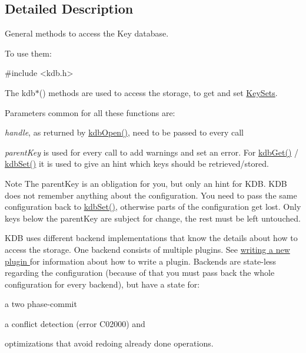 \subsection{Detailed Description}
General methods to access the Key database. 

To use them\+: 
\begin{DoxyCode}
\textcolor{preprocessor}{#include <kdb.h>}
\end{DoxyCode}


The kdb$\ast$() methods are used to access the storage, to get and set \hyperlink{group__keyset}{Key\+Sets}.

Parameters common for all these functions are\+:


\begin{DoxyItemize}
\item {\itshape handle}, as returned by \hyperlink{group__kdb_ga844e1299a84c3fbf1d3a905c5c893ba5}{kdb\+Open()}, need to be passed to every call
\item {\itshape parent\+Key} is used for every call to add warnings and set an error. For \hyperlink{group__kdb_ga28e385fd9cb7ccfe0b2f1ed2f62453a1}{kdb\+Get()} / \hyperlink{group__kdb_ga11436b058408f83d303ca5e996832bcf}{kdb\+Set()} it is used to give an hint which keys should be retrieved/stored.
\end{DoxyItemize}

\begin{DoxyNote}{Note}
The parent\+Key is an obligation for you, but only an hint for K\+DB. K\+DB does not remember anything about the configuration. You need to pass the same configuration back to \hyperlink{group__kdb_ga11436b058408f83d303ca5e996832bcf}{kdb\+Set()}, otherwise parts of the configuration get lost. Only keys below the parent\+Key are subject for change, the rest must be left untouched.
\end{DoxyNote}
K\+DB uses different backend implementations that know the details about how to access the storage. One backend consists of multiple plugins. See \hyperlink{group__plugin}{writing a new plugin } for information about how to write a plugin. Backends are state-\/less regarding the configuration (because of that you must pass back the whole configuration for every backend), but have a state for\+:


\begin{DoxyItemize}
\item a two phase-\/commit
\item a conflict detection (error C02000) and
\item optimizations that avoid redoing already done operations.
\end{DoxyItemize}


